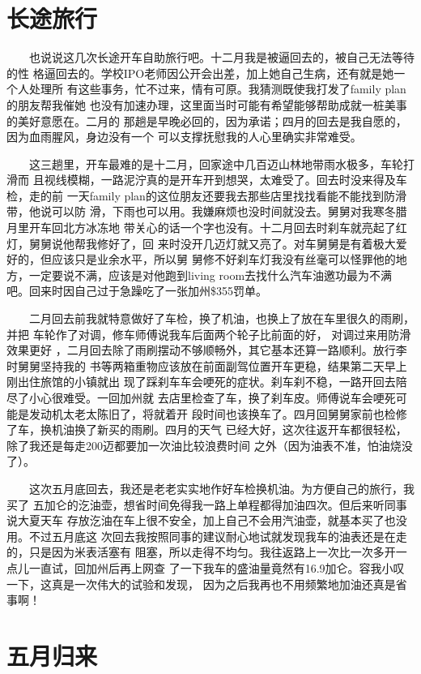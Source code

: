 \documentclass[12pt]{book}
\begin{document}
\section{长途旅行}
\label{sec-8-14}

　　也说说这几次长途开车自助旅行吧。十二月我是被逼回去的，被自己无法等待的性
格逼回去的。学校IPO老师因公开会出差，加上她自己生病，还有就是她一个人处理所
有这些事务，忙不过来，情有可原。我猜测既使我打发了family plan的朋友帮我催她
也没有加速办理，这里面当时可能有希望能够帮助成就一桩美事的美好意愿在。二月的
那趟是早晚必回的，因为承诺；四月的回去是我自愿的，因为血雨腥风，身边没有一个
可以支撑抚慰我的人心里确实非常难受。

　　这三趟里，开车最难的是十二月，回家途中几百迈山林地带雨水极多，车轮打滑而
且视线模糊，一路泥泞真的是开车开到想哭，太难受了。回去时没来得及车检，走的前
一天family plan的这位朋友还要我去那些店里找找看能不能找到防滑带，他说可以防
滑，下雨也可以用。我嫌麻烦也没时间就没去。舅舅对我寒冬腊月里开车回北方冰冻地
带关心的话一个字也没有。十二月回去时刹车就亮起了红灯，舅舅说他帮我修好了，回
来时没开几迈灯就又亮了。对车舅舅是有着极大爱好的，但应该只是业余水平，所以舅
舅修不好刹车灯我没有丝毫可以怪罪他的地方，一定要说不满，应该是对他跑到living
room去找什么汽车油邀功最为不满吧。回来时因自己过于急躁吃了一张加州\$355罚单。

　　二月回去前我就特意做好了车检，换了机油，也换上了放在车里很久的雨刷，并把
车轮作了对调，修车师傅说我车后面两个轮子比前面的好， 对调过来用防滑效果更好
，二月回去除了雨刷摆动不够顺畅外，其它基本还算一路顺利。放行李时舅舅坚持我的
书等两箱重物应该放在前面副驾位置开车更稳，结果第二天早上刚出住旅馆的小镇就出
现了踩刹车车会哽死的症状。刹车刹不稳，一路开回去陪尽了小心很难受。一回加州就
去店里检查了车，换了刹车皮。师傅说车会哽死可能是发动机太老太陈旧了，将就着开
段时间也该换车了。四月回舅舅家前也检修了车，换机油换了新买的雨刷。四月的天气
已经大好，这次往返开车都很轻松，除了我还是每走200迈都要加一次油比较浪费时间
之外（因为油表不准，怕油烧没了）。

　　这次五月底回去，我还是老老实实地作好车检换机油。为方便自己的旅行，我买了
五加仑的汔油壶，想省时间免得我一路上单程都得加油四次。但后来听同事说大夏天车
存放汔油在车上很不安全，加上自己不会用汽油壶，就基本买了也没用。不过五月底这
次回去我按照同事的建议耐心地试就发现我车的油表还是在走的，只是因为米表活塞有
阻塞，所以走得不均匀。我往返路上一次比一次多开一点儿一直试，回加州后再上网查
了一下我车的盛油量竟然有16.9加仑。容我小叹一下，这真是一次伟大的试验和发现，
因为之后我再也不用频繁地加油还真是省事啊！
\section{五月归来}
\label{sec-8-15}
\end{document}
